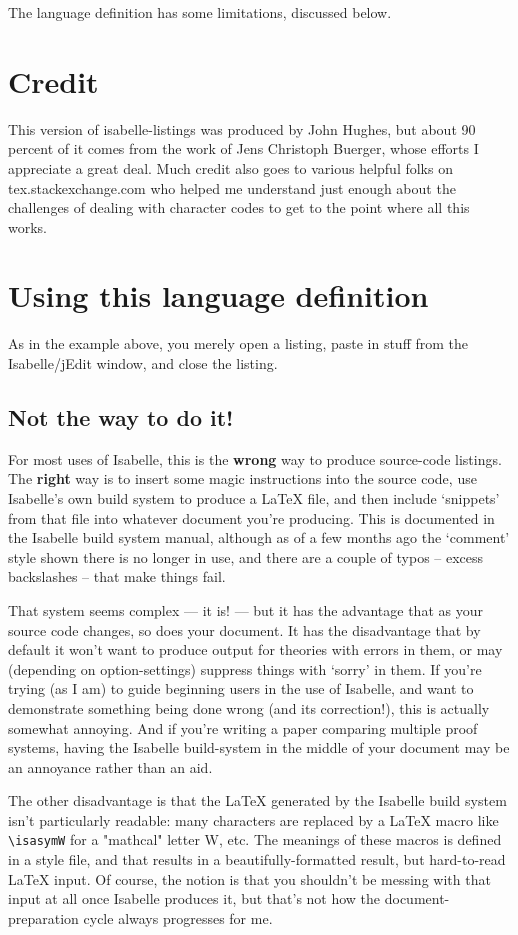 \documentclass[11pt,notitlepage,openany,oneside]{book}
\begin{document}
\noindent 
The language definition has some limitations, discussed below. 

\section{Credit}
This version of isabelle-listings was produced by John Hughes, but about 90 percent of it comes
from the work of Jens Christoph Buerger, whose efforts I appreciate a great deal. 
Much credit also goes to various helpful folks on tex.stackexchange.com who helped 
me understand just enough about the challenges of dealing with character codes to 
get to the point where all this works. 

\section{Using this language definition}
As in the example above, you merely open a listing, paste in stuff from the
Isabelle/jEdit window, and close the listing.

\subsection{Not the way to do it!}
For most uses of Isabelle, this is the \textbf{wrong} way to produce source-code
listings. The \textbf{right} way is to insert some magic instructions into the 
source code, use Isabelle's own build system to produce a LaTeX file, and then 
include `snippets' from that file into whatever document you're producing. 
This is documented in the Isabelle build system manual, although as of a few 
months ago the `comment' style shown there is no longer in use, and there are a 
couple of typos -- excess backslashes -- that make things fail. 

That system seems complex --- it is! --- but it has the advantage that as your 
source code changes, so does your document. It has the disadvantage that by 
default it won't want to produce output for theories with errors in them, or may 
(depending on option-settings) suppress things with `sorry' in them. If you're 
trying (as I am) to guide beginning users in the use of Isabelle, and want to 
demonstrate something being done wrong (and its correction!), this is actually 
somewhat annoying. And if you're writing a paper comparing multiple proof 
systems, having the Isabelle build-system in the middle of your document 
may be an annoyance rather than an aid. 

The other disadvantage is that the LaTeX generated by the Isabelle build 
system isn't particularly readable: many characters are replaced by a LaTeX 
macro like \verb|\isasymW| for a "mathcal" letter W, etc. The meanings of 
these macros is defined in a style file, and that results in a 
beautifully-formatted result, but hard-to-read LaTeX input. Of course, the 
notion is that you shouldn't be messing with that input at all once Isabelle 
produces it, but that's not how the document-preparation cycle always 
progresses for me. 
\end{document}
